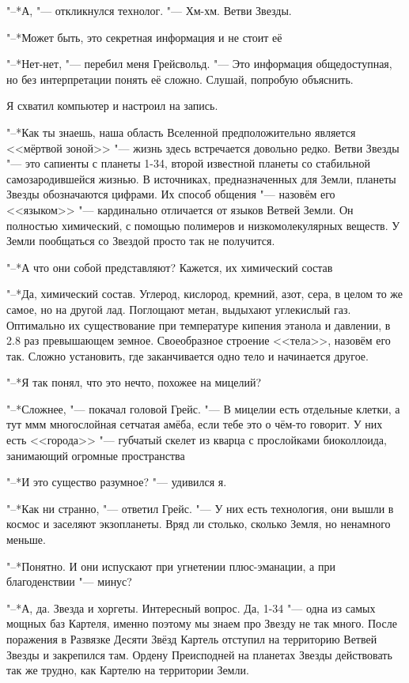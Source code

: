 \documentclass[a4paper,10pt]{book}
\newcommand{\ldotst}{\so{...}\xspace}
\newcommand{\ldotsq}{\so{?\hbox{\hspace{-.212em}}..}\xspace}
\begin{document}
"--*А, "--- откликнулся технолог. "--- Хм-хм. Ветви Звезды.

"--*Может быть, это секретная информация и не стоит её\ldotsq

"--*Нет-нет, "--- перебил меня Грейсвольд. "--- Это информация общедоступная, 
но 
без интерпретации понять её сложно. Слушай, попробую объяснить.

Я схватил компьютер и настроил на запись.

"--*Как ты знаешь, наша область Вселенной предположительно является <<мёртвой 
зоной>> "--- жизнь здесь встречается довольно редко. 
Ветви Звезды "--- это сапиенты с планеты 1-34, второй 
известной планеты со стабильной самозародившейся жизнью. В источниках, 
предназначенных для Земли, планеты Звезды обозначаются цифрами. Их способ 
общения "--- назовём его <<языком>> "--- кардинально отличается от языков 
Ветвей 
Земли. Он полностью химический, с помощью полимеров и низкомолекулярных 
веществ. У Земли пообщаться со Звездой просто так не получится.

"--*А что они собой представляют? Кажется, их химический состав\ldotst

"--*Да, химический состав. Углерод, кислород, кремний, азот, сера, в целом то 
же самое, но на другой лад. Поглощают метан, выдыхают углекислый газ. 
Оптимально их существование при температуре кипения этанола и давлении, в 2.8 
раз превышающем земное. Своеобразное строение <<тела>>, назовём его так. Сложно 
установить, где заканчивается одно тело и начинается другое.

"--*Я так понял, что это нечто, похожее на мицелий?

"--*Сложнее, "--- покачал головой Грейс. "--- В мицелии есть отдельные клетки, 
а 
тут\ldotst ммм\ldotst многослойная сетчатая амёба, если тебе это о чём-то 
говорит. У них есть <<города>> "--- губчатый скелет из кварца с прослойками 
биоколлоида, занимающий огромные пространства\ldotst

"--*И это существо разумное? "--- удивился я.

"--*Как ни странно, "--- ответил Грейс. "--- У них есть технология, они вышли в 
космос и заселяют экзопланеты. Вряд ли столько, сколько Земля, но ненамного 
меньше.

"--*Понятно. И они испускают при угнетении плюс-эманации, а при благоденствии 
"--- минус?

"--*А, да. Звезда и хоргеты. Интересный вопрос. Да, 1-34 "--- одна из самых 
мощных баз Картеля, именно поэтому мы знаем про Звезду не так много. После 
поражения в Развязке Десяти Звёзд Картель отступил на территорию Ветвей Звезды 
и закрепился там. Ордену Преисподней на планетах Звезды действовать так же 
трудно, как Картелю на территории Земли.
\end{document}
